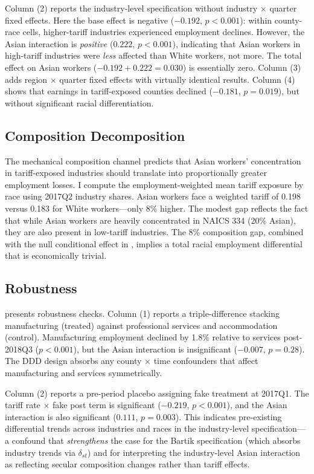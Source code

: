 \documentclass[12pt]{article}
\begin{document}
Column (2) reports the industry-level specification without industry $\times$ quarter fixed effects. Here the base effect is negative ($-0.192$, $p < 0.001$): within county-race cells, higher-tariff industries experienced employment declines. However, the Asian interaction is \textit{positive} ($0.222$, $p < 0.001$), indicating that Asian workers in high-tariff industries were \textit{less} affected than White workers, not more. The total effect on Asian workers ($-0.192 + 0.222 = 0.030$) is essentially zero. Column (3) adds region $\times$ quarter fixed effects with virtually identical results. Column (4) shows that earnings in tariff-exposed counties declined ($-0.181$, $p = 0.019$), but without significant racial differentiation.



\subsection{Composition Decomposition}

The mechanical composition channel predicts that Asian workers' concentration in tariff-exposed industries should translate into proportionally greater employment losses. I compute the employment-weighted mean tariff exposure by race using 2017Q2 industry shares. Asian workers face a weighted tariff of 0.198 versus 0.183 for White workers---only 8\% higher. The modest gap reflects the fact that while Asian workers are heavily concentrated in NAICS 334 (20\% Asian), they are also present in low-tariff industries. The 8\% composition gap, combined with the null conditional effect in , implies a total racial employment differential that is economically trivial.

\subsection{Robustness}

 presents robustness checks. Column (1) reports a triple-difference stacking manufacturing (treated) against professional services and accommodation (control). Manufacturing employment declined by 1.8\% relative to services post-2018Q3 ($p < 0.001$), but the Asian interaction is insignificant ($-0.007$, $p = 0.28$). The DDD design absorbs any county $\times$ time confounders that affect manufacturing and services symmetrically.

Column (2) reports a pre-period placebo assigning fake treatment at 2017Q1. The tariff rate $\times$ fake post term is significant ($-0.219$, $p < 0.001$), and the Asian interaction is also significant ($0.111$, $p = 0.003$). This indicates pre-existing differential trends across industries and races in the industry-level specification---a confound that \textit{strengthens} the case for the Bartik specification (which absorbs industry trends via $\delta_{st}$) and for interpreting the industry-level Asian interaction as reflecting secular composition changes rather than tariff effects.
\end{document}
